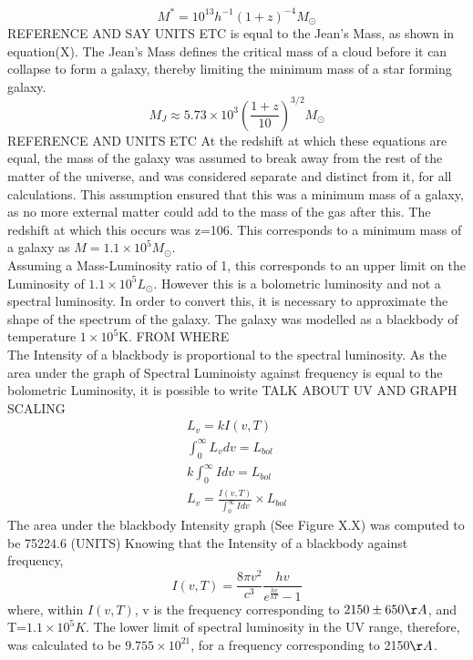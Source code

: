 \documentclass[pdf,color]{UoBnote}
\begin{document}
\begin{equation}
M^*=10^{13}h^{-1}(1+z)^{-4} M_\odot
\end{equation}
REFERENCE AND SAY UNITS ETC
is equal to the Jean's Mass, as shown in equation(X). The Jean's Mass defines the critical mass of a cloud before it can collapse to form a galaxy, thereby limiting the minimum mass of a star forming galaxy.
\begin{equation}
M_J\approx 5.73\times10^3 \left (\frac{1+z}{10} \right )^{3/2} M_{\odot}
\end{equation}
REFERENCE AND UNITS ETC
At the redshift at which these equations are equal, the mass of the galaxy was assumed to break away from the rest of the matter of the universe, and was considered separate and distinct from it, for all calculations. This assumption ensured that this was a minimum mass of a galaxy, as no more external matter could add to the mass of the gas after this. The redshift at which this occurs was z=106. This corresponds to a minimum mass of a galaxy as $M=1.1\times10^5M_\odot$.\\
\newline
Assuming a Mass-Luminosity ratio of 1, this corresponds to an upper limit on the Luminosity of $1.1\times 10^5 L_\odot$. However this is a bolometric luminosity and not a spectral luminosity. In order to convert this, it is necessary to approximate the shape of the spectrum of the galaxy. The galaxy was modelled as a blackbody of temperature $1\times 10^5$K. FROM WHERE \\
\newline
The Intensity of a blackbody is proportional to the spectral luminosity. As the area under the graph of Spectral Luminoisty against frequency is equal to the bolometric Luminosity, it is possible to write TALK ABOUT UV AND GRAPH SCALING
\begin{eqnarray}
L_v= kI(v,T) \\
\int^{\infty}_{0}L_v dv=L_{bol} \\
k\int^{\infty}_{0}I dv=L_{bol} \\
L_v = \frac{I(v,T)}{\int^{\infty}_{0}I dv} \times L_{bol}
\end{eqnarray}
The area under the blackbody Intensity graph (See Figure X.X) was computed to be 75224.6 (UNITS) Knowing that the Intensity of a blackbody against frequency,
\begin{equation}
I(v,T)=\frac{8\pi v^2}{c^3}\frac{hv}{e^\frac{hv}{kT}-1}
\end{equation}
where, within $I(v,T)$, v is the frequency corresponding to $2150\pm 650 \AA$, and T=$1.1\times 10^5K$. The lower limit of spectral luminosity in the UV range, therefore, was calculated to be $9.755\times 10^{21}$, for a frequency corresponding to 2150$\AA$.
\end{document}
